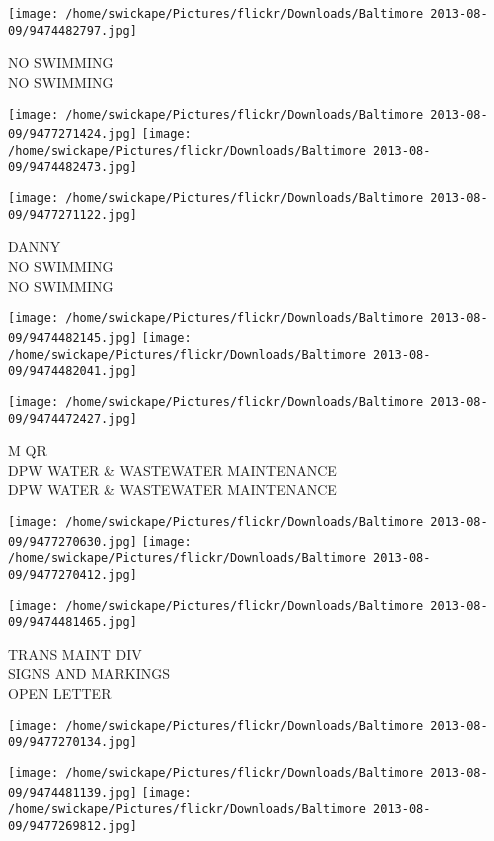 \documentclass[10pt,letterpaper]{article}
\begin{document}
\vspace{0.25in}
\texttt{[image: /home/swickape/Pictures/flickr/Downloads/Baltimore 2013-08-09/9474482797.jpg]}

NO SWIMMING\\
NO SWIMMING
\pagebreak

\texttt{[image: /home/swickape/Pictures/flickr/Downloads/Baltimore 2013-08-09/9477271424.jpg]}
\texttt{[image: /home/swickape/Pictures/flickr/Downloads/Baltimore 2013-08-09/9474482473.jpg]}

\vspace{0.25in}
\texttt{[image: /home/swickape/Pictures/flickr/Downloads/Baltimore 2013-08-09/9477271122.jpg]}

DANNY\\
NO SWIMMING\\
NO SWIMMING
\pagebreak

\texttt{[image: /home/swickape/Pictures/flickr/Downloads/Baltimore 2013-08-09/9474482145.jpg]}
\texttt{[image: /home/swickape/Pictures/flickr/Downloads/Baltimore 2013-08-09/9474482041.jpg]}

\vspace{0.25in}
\texttt{[image: /home/swickape/Pictures/flickr/Downloads/Baltimore 2013-08-09/9474472427.jpg]}

M QR\\
DPW WATER \& WASTEWATER MAINTENANCE\\
DPW WATER \& WASTEWATER MAINTENANCE
\pagebreak

\texttt{[image: /home/swickape/Pictures/flickr/Downloads/Baltimore 2013-08-09/9477270630.jpg]}
\texttt{[image: /home/swickape/Pictures/flickr/Downloads/Baltimore 2013-08-09/9477270412.jpg]}

\texttt{[image: /home/swickape/Pictures/flickr/Downloads/Baltimore 2013-08-09/9474481465.jpg]}

TRANS MAINT DIV\\
SIGNS AND MARKINGS\\
OPEN LETTER
\pagebreak

\texttt{[image: /home/swickape/Pictures/flickr/Downloads/Baltimore 2013-08-09/9477270134.jpg]}

\vspace{0.25in}
\texttt{[image: /home/swickape/Pictures/flickr/Downloads/Baltimore 2013-08-09/9474481139.jpg]}
\texttt{[image: /home/swickape/Pictures/flickr/Downloads/Baltimore 2013-08-09/9477269812.jpg]}
\end{document}
